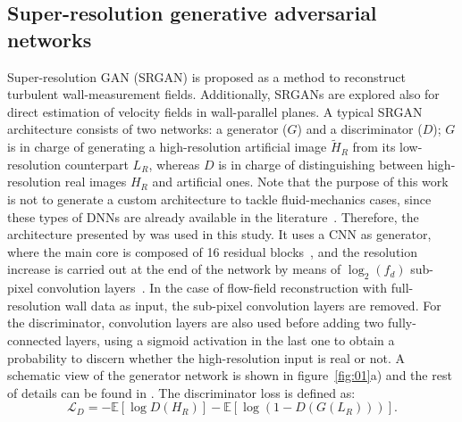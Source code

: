 \subsection{Super-resolution generative adversarial networks}
Super-resolution GAN (SRGAN) is proposed as a method to reconstruct turbulent wall-measurement fields.
Additionally, SRGANs are explored also for direct estimation of velocity fields in wall-parallel planes.
A typical SRGAN architecture consists of two networks: a generator ($G$) and a discriminator ($D$); $G$ is in charge of generating a high-resolution artificial image $\widetilde{H}_R$ from its low-resolution counterpart $L_R$, whereas $D$ is in charge of distinguishing between high-resolution real images $H_R$ and artificial ones.
Note that the purpose of this work is not to generate a custom architecture to tackle fluid-mechanics cases, since these types of DNNs are already available in the literature~\citep{deng2019super,werhahn2019multi,kim2021unsupervised}.
Therefore, the architecture presented by \citet{ledig2017photo} was used in this study.
It uses a CNN as generator, where the main core is composed of 16 residual blocks~\citep{he2016deep}, and the resolution increase is carried out at the end of the network by means of $\log_2(f_d)$ sub-pixel convolution layers~\citep{shi2016real}.
In the case of flow-field reconstruction with full-resolution wall data as input, the sub-pixel convolution layers are removed.
For the discriminator, convolution layers are also used before adding two fully-connected layers, using a sigmoid activation in the last one to obtain a probability to discern whether the high-resolution input is real or not.
A schematic view of the generator network is shown in figure~\ref{fig:01}a) and the rest of details can be found in \citet{ledig2017photo}.
The discriminator loss is defined as:
\begin{equation}
    \mathcal{L}_D=-\mathbb{E}[\log D(H_R)] - \mathbb{E}[\log(1-D(G(L_R)))].
\end{equation}

